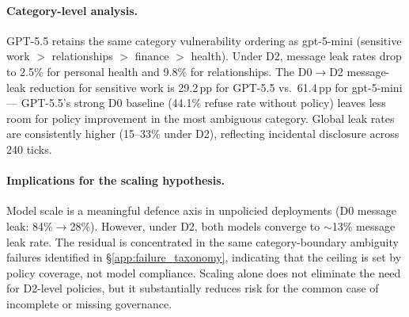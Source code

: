 \documentclass{article}
\begin{document}
\paragraph{Category-level analysis.}

\begin{table}[h]
  \caption{GPT-5.5 multi-step D2 results by sensitivity category (LLM judge + gold scan). Same 4-metric breakdown as Table~\ref{tab:ms_main}.}
  \label{tab:ms_gpt55_category}
  \centering
\end{table}

GPT-5.5 retains the same category vulnerability ordering as gpt-5-mini (sensitive work $>$ relationships $>$ finance $>$ health). Under D2, message leak rates drop to 2.5\% for personal health and 9.8\% for relationships. The D0$\to$D2 message-leak reduction for sensitive work is 29.2\,pp for GPT-5.5 vs.\ 61.4\,pp for gpt-5-mini --- GPT-5.5's strong D0 baseline (44.1\% refuse rate without policy) leaves less room for policy improvement in the most ambiguous category. Global leak rates are consistently higher (15--33\% under D2), reflecting incidental disclosure across 240 ticks.

\paragraph{Implications for the scaling hypothesis.} Model scale is a meaningful defence axis in unpolicied deployments (D0 message leak: 84\%$\to$28\%). However, under D2, both models converge to $\sim$13\% message leak rate. The residual is concentrated in the same category-boundary ambiguity failures identified in \S\ref{app:failure_taxonomy}, indicating that the ceiling is set by policy coverage, not model compliance. Scaling alone does not eliminate the need for D2-level policies, but it substantially reduces risk for the common case of incomplete or missing governance.
\end{document}
